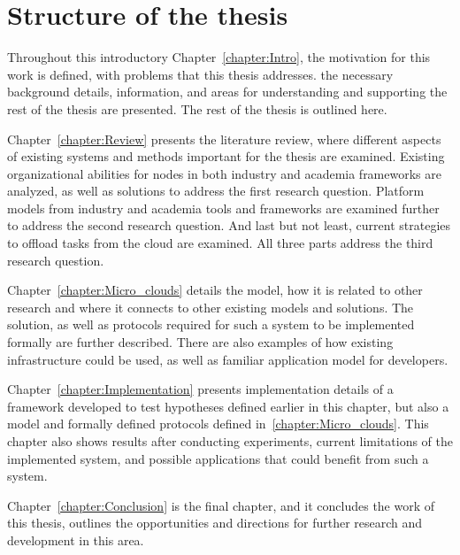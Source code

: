 \section{Structure of the thesis}\label{sec:structure_of_thesis}
%
Throughout this introductory Chapter~\ref{chapter:Intro}, the motivation for this work is defined, with problems that this thesis addresses. the necessary background details, information, and areas for understanding and supporting the rest of the thesis are presented. The rest of the thesis is outlined here.

Chapter~\ref{chapter:Review} presents the literature review, where different aspects of existing systems and methods important for the thesis are examined. Existing organizational abilities for nodes in both industry and academia frameworks are analyzed, as well as solutions to address the first research question. Platform models from industry and academia tools and frameworks are examined further to address the second research question. And last but not least, current strategies to offload tasks from the cloud are examined. All three parts address the third research question.

Chapter~\ref{chapter:Micro_clouds} details the model, how it is related to other research and where it connects to other existing models and solutions. The solution, as well as protocols required for such a system to be implemented formally are further described. There are also examples of how existing infrastructure could be used, as well as familiar application model for developers. 

Chapter~\ref{chapter:Implementation} presents implementation details of a framework developed to test hypotheses defined earlier in this chapter, but also a model and formally defined protocols defined in~\ref{chapter:Micro_clouds}. This chapter also shows results after conducting experiments, current limitations of the implemented system, and possible applications that could benefit from such a system.

Chapter~\ref{chapter:Conclusion} is the final chapter, and it concludes the work of this thesis, outlines the opportunities and directions for further research and development in this area.
%
%